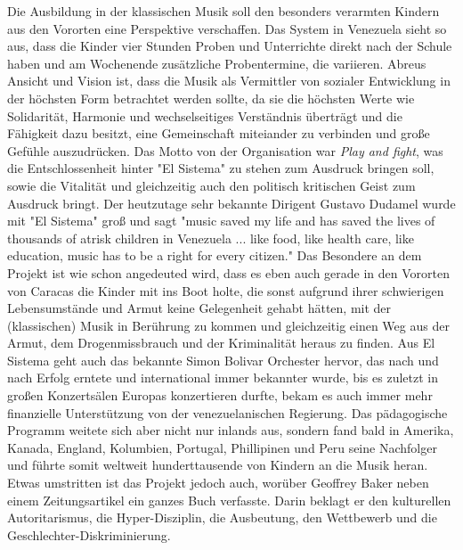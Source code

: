 Die Ausbildung in der klassischen Musik soll den besonders verarmten Kindern aus
den Vororten eine Perspektive verschaffen. Das System in Venezuela sieht so aus,
dass die Kinder vier Stunden Proben und Unterrichte direkt nach der Schule haben
und am Wochenende zusätzliche Probentermine, die variieren. Abreus Ansicht und
Vision ist, dass die Musik als Vermittler von sozialer Entwicklung in der
höchsten Form betrachtet werden sollte, da sie die höchsten Werte wie
Solidarität, Harmonie und wechselseitiges Verständnis überträgt und die
Fähigkeit dazu besitzt, eine Gemeinschaft miteiander zu verbinden und große
Gefühle auszudrücken. Das Motto von der Organisation war \emph{Play and fight},
was die Entschlossenheit hinter "El Sistema" zu stehen zum Ausdruck bringen
soll, sowie die Vitalität und gleichzeitig auch den politisch kritischen Geist
zum Ausdruck bringt. Der heutzutage sehr bekannte Dirigent Gustavo Dudamel wurde
mit "El Sistema" groß und sagt "music saved my life and has saved the lives of
thousands of atrisk children in Venezuela ... like food, like health care, like
education, music has to be a right for every
citizen."%
Das Besondere an dem Projekt ist wie schon angedeuted wird, dass es eben auch
gerade in den Vororten von Caracas die Kinder mit ins Boot holte, die sonst
aufgrund ihrer schwierigen Lebensumstände und Armut keine Gelegenheit gehabt
hätten, mit der (klassischen) Musik in Berührung zu kommen und gleichzeitig
einen Weg aus der Armut, dem Drogenmissbrauch und der Kriminalität heraus zu
finden. Aus El Sistema geht auch das bekannte Simon Bolivar Orchester hervor,
das nach und nach Erfolg erntete und international immer bekannter wurde, bis es
zuletzt in großen Konzertsälen Europas konzertieren durfte, bekam es auch immer
mehr finanzielle Unterstützung von der venezuelanischen Regierung. Das
pädagogische Programm weitete sich aber nicht nur inlands aus, sondern fand bald
in Amerika, Kanada, England, Kolumbien, Portugal, Phillipinen und Peru seine
Nachfolger und führte somit weltweit hunderttausende von Kindern an die Musik
heran. Etwas umstritten ist das Projekt jedoch auch, worüber Geoffrey Baker
neben einem Zeitungsartikel ein ganzes Buch verfasste. Darin beklagt er den
kulturellen Autoritarismus, die Hyper-Disziplin, die Ausbeutung, den Wettbewerb
und die Geschlechter-Diskriminierung. 

